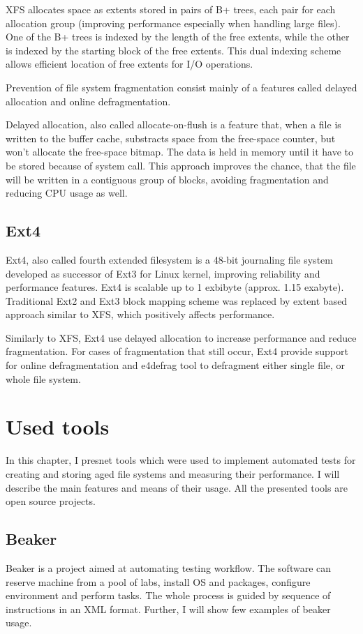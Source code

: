 \documentclass[
  color, %
  table, %
  lof,   %
  lot,   %
]{fithesis3}
\begin{document}
XFS allocates space as extents stored in pairs of B+ trees, each pair for each allocation group (improving performance especially when handling large files). One of the B+ trees is indexed by the length of the free extents, while the other is indexed by the starting block of the free extents. This dual indexing scheme allows efficient location of free extents for I/O operations.

Prevention of file system fragmentation consist mainly of a features called delayed allocation and online defragmentation.

Delayed allocation, also called allocate-on-flush is a feature that, when a file is written to the buffer cache, substracts space from the free-space counter, but won't allocate the free-space bitmap. The data is held in memory until it have to be stored because of system call. This approach improves the chance, that the file will be written in a contiguous group of blocks, avoiding fragmentation and reducing CPU usage as well.

\section{Ext4}
Ext4, also called fourth extended filesystem is a 48-bit journaling file system developed as successor of Ext3 for Linux kernel, improving reliability and performance features. Ext4 is scalable up to 1 exbibyte (approx. 1.15 exabyte). Traditional Ext2 and Ext3 block mapping scheme was replaced by extent based approach similar to XFS, which positively affects performance.

Similarly to XFS, Ext4 use delayed allocation to increase performance and reduce fragmentation. For cases of fragmentation that still occur, Ext4 provide support for online defragmentation and e4defrag tool to defragment either single file, or whole file system.

\chapter{Used tools}
In this chapter, I presnet tools which were used to implement automated tests for creating and storing aged file systems and measuring their performance. I will describe the main features and means of their usage. All the presented tools are open source projects.

\section{Beaker}
Beaker is a project aimed at automating testing workflow. The software can reserve machine from a pool of labs, install OS and packages, configure environment and perform tasks. The whole process is guided by sequence of instructions in an XML format. Further, I will show few examples of beaker usage.
\end{document}
